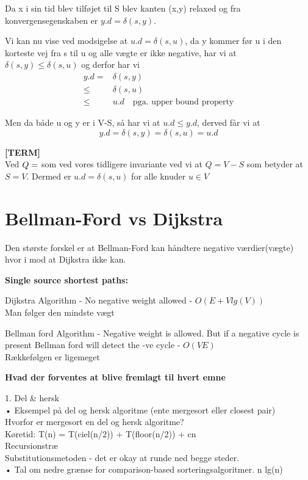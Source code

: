 \documentclass[11pt,a4paper]{report}
\theoremstyle{plain}
\theoremstyle{definition}
\theoremstyle{remark}
\numberwithin{equation}{section}
\begin{document}
Da x i sin tid blev tilføjet til S blev kanten (x,y) relaxed og fra konvergensegenskaben er $y.d = \delta(s,y)$.

Vi kan nu vise ved modsigelse at $u.d=\delta(s,u)$, da y kommer før u i den korteste vej fra s til u og alle vægte er ikke negative, har vi at $\delta(s,y)\leq\delta(s,u)$ og derfor har vi
\begin{align*}
  y.d = & \delta(s,y) \\
  \leq & \delta(s,u) \\
  \leq & u.d \quad \text{pga. upper bound property}
\end{align*}

Men da både u og y er i V-S, så har vi at $u.d\leq y.d$, derved får vi at
\[
y.d = \delta(s,y) = \delta(s,u) = u.d
\]

\textbf{[TERM]}\\
Ved $Q = \empty$ som ved vores tidligere invariante ved vi at $Q = V-S$ som betyder at $S = V$. Dermed er $u.d = \delta(s,u)$ for alle knuder $u\in V$


\section*{Bellman-Ford vs Dijkstra}
Den største forskel er at Bellman-Ford kan håndtere negative værdier(vægte) hvor i mod at Dijkstra ikke kan.

\textbf{Single source shortest paths:}

Dijkstra Algorithm - No negative weight allowed - $O(E+Vlg(V))$\\
Man følger den mindste vægt

Bellman ford Algorithm - Negative weight is allowed. But if a negative cycle is present Bellman ford will detect the -ve cycle - $O(VE)$\\
Rækkefølgen er ligemeget

\newpage
\textbf{Hvad der forventes at blive fremlagt til hvert emne
}

1. Del \& hersk\\
 • Eksempel på del og hersk algoritme (ente mergesort eller closest pair)\\
 	Hvorfor er mergesort en del og hersk algoritme?\\
 	Køretid: T(n) = T(ciel(n/2)) + T(floor(n/2)) + cn\\
 	Recursionstræ\\
 	Substitutionsmetoden - det er okay at runde ned begge steder.\\
 • Tal om nedre grænse for comparison-based sorteringsalgoritmer. n lg(n)\\
\end{document}
